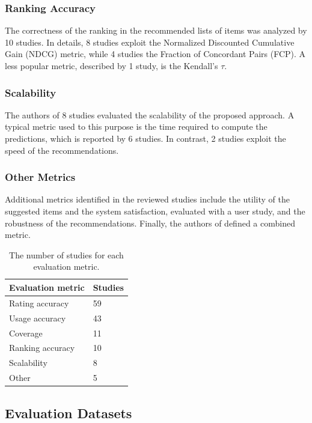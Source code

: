 \subsubsection{Ranking Accuracy}

The correctness of the ranking in the recommended lists of items was analyzed by 10 studies. In details, 8 studies exploit the Normalized Discounted Cumulative Gain (NDCG) metric, while 4 studies the Fraction of Concordant Pairs (FCP). A less popular metric, described by 1 study, is the Kendall's $\tau$.

\subsubsection{Scalability}

The authors of 8 studies evaluated the scalability of the proposed approach. A typical metric used to this purpose is the time required to compute the predictions, which is reported by 6 studies. In contrast, 2 studies exploit the speed of the recommendations.

\subsubsection{Other Metrics}

Additional metrics identified in the reviewed studies include the utility of the suggested items and the system satisfaction, evaluated with a user study, and the robustness of the recommendations. Finally, the authors of  defined a combined metric.

\begin{table}
\centering
\begin{tabular}{@{}ll@{}}
\toprule
Evaluation metric & Studies \\ \midrule
Rating accuracy   & 59      \\
Usage accuracy    & 43      \\
Coverage          & 11      \\
Ranking accuracy  & 10      \\
Scalability       & 8       \\
Other             & 5       \\ \bottomrule
\end{tabular}
\caption[Studies per evaluation metric]{The number of studies for each evaluation metric.}
\label{mcr:tab:metrics}
\end{table}

\subsection{Evaluation Datasets}
\label{mcr:sec:datasets}

